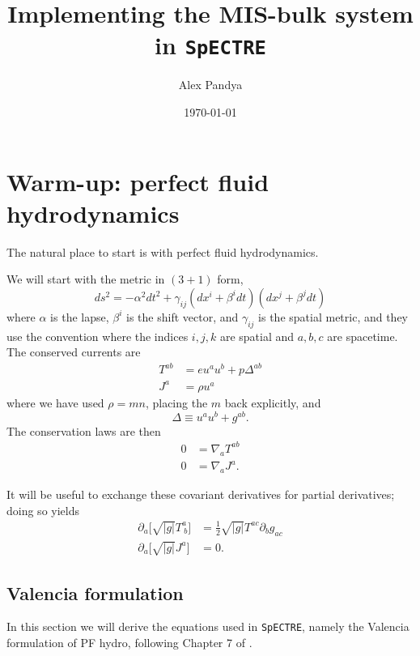 \documentclass[12pt]{article}
\numberwithin{equation}{section}
\begin{document}
\title{Implementing the MIS-bulk system in {\tt SpECTRE}}
\author{Alex Pandya}
\date{\today}
\maketitle

\section{Warm-up: perfect fluid hydrodynamics}

The natural place to start is with perfect fluid hydrodynamics.

We will start with the metric in $(3+1)$ form,
\begin{equation}
ds^2 = - \alpha^2 dt^2 + \gamma_{ij} (dx^i + \beta^i dt) (dx^j + \beta^j dt)
\end{equation}
where $\alpha$ is the lapse, $\beta^{i}$ is the shift vector, and $\gamma_{ij}$
is the spatial metric, and they use the convention where the indices $i,j,k$
are spatial and $a,b,c$ are spacetime.
The conserved currents are
\begin{align}
T^{ab} &= e u^a u^b + p \Delta^{ab} \\
J^{a} &= \rho u^a
\end{align}
where we have used $\rho = m n$, placing the $m$ back explicitly, and
\begin{equation}
\Delta \equiv u^a u^b + g^{ab}.
\end{equation}
The conservation laws are then
\begin{align}
0 &= \nabla_{a} T^{ab} \\
0 &= \nabla_{a} J^{a}.
\end{align}

It will be useful to exchange these covariant derivatives for partial derivatives; doing so yields
\begin{align}
\partial_a \big[ \sqrt{|g|} T^{a}_{~b} \big] &= \frac{1}{2} \sqrt{|g|} T^{ac} \partial_{b} g_{ac} \\
\partial_a \big[ \sqrt{|g|} J^{a} \big] &= 0.
\end{align}

\subsection{Valencia formulation}

In this section we will derive the equations used in {\tt SpECTRE}, namely the Valencia formulation of PF hydro, following Chapter 7 of \cite{RezzollaZanotti}.
\end{document}
